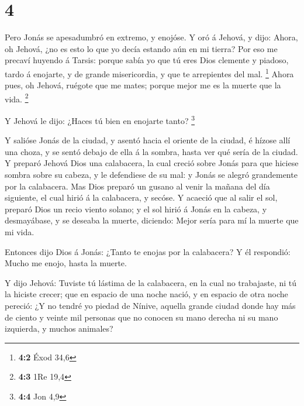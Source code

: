 \hypertarget{section-3}{%
\section{4}\label{section-3}}

 Pero Jonás se apesadumbró en extremo, y enojóse.
 Y oró á Jehová, y dijo: Ahora, oh Jehová, ¿no es esto lo
que yo decía estando aún en mi tierra? Por eso me precaví huyendo á
Tarsis: porque sabía yo que tú eres Dios clemente y piadoso, tardo á
enojarte, y de grande misericordia, y que te arrepientes del mal.
\footnote{\textbf{4:2} Éxod 34,6}  Ahora pues, oh Jehová,
ruégote que me mates; porque mejor me es la muerte que la vida.
\footnote{\textbf{4:3} 1Re 19,4}

 Y Jehová le dijo: ¿Haces tú bien en enojarte tanto?
\footnote{\textbf{4:4} Jon 4,9}

 Y salióse Jonás de la ciudad, y asentó hacia el oriente
de la ciudad, é hízose allí una choza, y se sentó debajo de ella á la
sombra, hasta ver qué sería de la ciudad.  Y preparó
Jehová Dios una calabacera, la cual creció sobre Jonás para que hiciese
sombra sobre su cabeza, y le defendiese de su mal: y Jonás se alegró
grandemente por la calabacera.  Mas Dios preparó un gusano
al venir la mañana del día siguiente, el cual hirió á la calabacera, y
secóse.  Y acaeció que al salir el sol, preparó Dios un
recio viento solano; y el sol hirió á Jonás en la cabeza, y desmayábase,
y se deseaba la muerte, diciendo: Mejor sería para mí la muerte que mi
vida.

 Entonces dijo Dios á Jonás: ¿Tanto te enojas por la
calabacera? Y él respondió: Mucho me enojo, hasta la muerte.

 Y dijo Jehová: Tuviste tú lástima de la calabacera, en
la cual no trabajaste, ni tú la hiciste crecer; que en espacio de una
noche nació, y en espacio de otra noche pereció:  ¿Y no
tendré yo piedad de Nínive, aquella grande ciudad donde hay más de
ciento y veinte mil personas que no conocen su mano derecha ni su mano
izquierda, y muchos animales?
